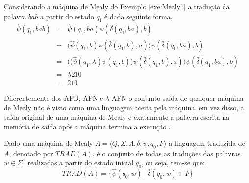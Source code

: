 \begin{example}\label{exe:TraducaoPalavra}
	Considerando a máquina de Mealy do Exemplo \ref{exe:Mealy1} a tradução da palavra $bab$ a partir do estado $q_1$ é dada seguinte forma,
	\begin{eqnarray*}
		\widehat{\psi}(q_1, bab) & = & \widehat{\psi}(q_1, ba)\psi(\widehat{\delta}(q_1, ba), b)\\
		& = & \Big(\widehat{\psi}(q_1, b)\psi(\widehat{\delta}(q_1, b), a)\Big)\psi(\widehat{\delta}(q_1, ba), b)\\
		& = & \Big(\Big(\widehat{\psi}(q_1, \lambda)\psi(q_1, b)\Big)\psi(\widehat{\delta}(q_1, b), a)\Big)\psi(\widehat{\delta}(q_1, ba), b)\\
		& = & \lambda 210\\
		& = & 210
	\end{eqnarray*}
\end{example}

Diferentemente dos AFD, AFN e $\lambda$-AFN o conjunto saída de qualquer máquina de Mealy não é visto como uma linguagem aceita pela máquina, em vez disso, a saída original de uma máquina de Mealy é exatamente a palavra escrita na memória de saída após a máquina termina a execução \cite{reinier2019}.

\begin{definition}
	Dado uma máquina de Mealy $A = \langle Q, \Sigma, \Lambda, \delta, \psi, q_0, F\rangle$ a linguagem traduzida de $A$, denotado por $TRAD(A)$, é o conjunto de todas as traduções das palavras $w \in \Sigma^*$ realizadas a partir do estado inicial $q_0$, ou seja, tem-se que:
	\begin{equation}
		TRAD(A) = \{\widehat{\psi}(q_0, w)  \mid \widehat{\delta}(q_0, w) \in F\}
	\end{equation}
\end{definition}

